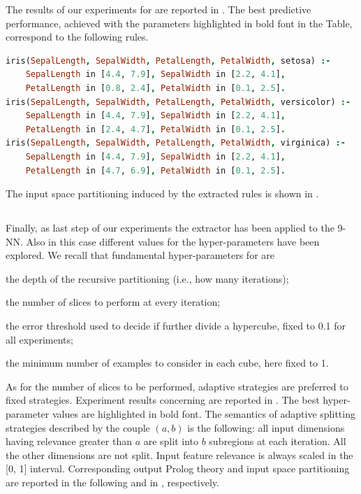 \documentclass[
]{ceurart}
\begin{document}
The results of our experiments for \iter{} are reported in .
%
The best predictive performance, achieved with the parameters highlighted in bold font in the Table, correspond to the following rules.
%
\begin{lstlisting}[language=Prolog]
iris(SepalLength, SepalWidth, PetalLength, PetalWidth, setosa) :-
    SepalLength in [4.4, 7.9], SepalWidth in [2.2, 4.1], 
    PetalLength in [0.8, 2.4], PetalWidth in [0.1, 2.5].
iris(SepalLength, SepalWidth, PetalLength, PetalWidth, versicolor) :-
    SepalLength in [4.4, 7.9], SepalWidth in [2.2, 4.1], 
    PetalLength in [2.4, 4.7], PetalWidth in [0.1, 2.5].
iris(SepalLength, SepalWidth, PetalLength, PetalWidth, virginica) :-
    SepalLength in [4.4, 7.9], SepalWidth in [2.2, 4.1], 
    PetalLength in [4.7, 6.9], PetalWidth in [0.1, 2.5].
\end{lstlisting}
%
The input space partitioning induced by the extracted rules is shown in .

\subsection{\gridex{}}



Finally, as last step of our experiments the \gridex{} extractor has been applied to the 9-NN.
%
Also in this case different values for the hyper-parameters have been explored.
%
We recall that fundamental hyper-parameters for \gridex{} are
%
\begin{inlinelist}
	\item the depth of the recursive partitioning (i.e., how many iterations);
	\item the number of slices to perform at every iteration;
	\item the error threshold used to decide if further divide a hypercube, fixed to 0.1 for all experiments;
	\item the minimum number of examples to consider in each cube, here fixed to 1.
\end{inlinelist}
%
As for the number of slices to be performed, adaptive strategies are preferred to fixed strategies.
%
Experiment results concerning \gridex{} are reported in .
%
The best hyper-parameter values are highlighted in bold font.
%
The semantics of adaptive splitting strategies described by the couple $(a, b)$ is the following: all input dimensions having relevance greater than $a$ are split into $b$ subregions at each iteration.
%
All the other dimensions are not split.
%
Input feature relevance is always scaled in the [0, 1] interval.
%
Corresponding output Prolog theory and input space partitioning are reported in the following and in , respectively.
\end{document}
